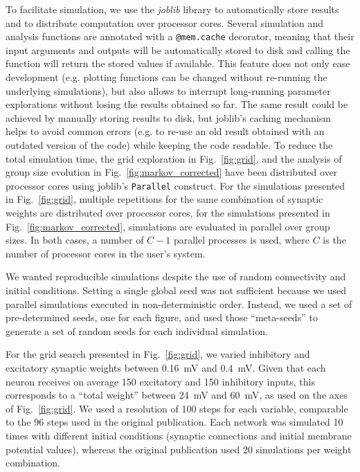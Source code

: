 \documentclass[10pt,a4paper,onecolumn]{article}
\begin{document}
To facilitate simulation, we use the \emph{joblib} library to automatically store results and to distribute computation over processor cores. Several simulation and analysis functions are annotated with a \verb|@mem.cache| decorator, meaning that their input arguments and outputs will be automatically stored to disk and calling the function will return the stored values if available. This feature does not only ease development (e.g. plotting functions can be changed without re-running the underlying simulations), but also allows to interrupt long-running parameter explorations without losing the results obtained so far. The same result could be achieved by manually storing results to disk, but joblib's caching mechanism helps to avoid common errors (e.g. to re-use an old result obtained with an outdated version of the code) while keeping the code readable. To reduce the total simulation time, the grid exploration in Fig.~\ref{fig:grid}, and the analysis of group size evolution in Fig.~\ref{fig:markov_corrected} have been distributed over processor cores using joblib's \verb|Parallel| construct. For the simulations presented in Fig.~\ref{fig:grid}, multiple repetitions for the same combination of synaptic weights are distributed over processor cores, for the simulations presented in Fig.~\ref{fig:markov_corrected}, simulations are evaluated in parallel over group sizes. In both cases, a number of $C-1$ parallel processes is used, where $C$ is the number of processor cores in the user's system.

We wanted reproducible simulations despite the use of random connectivity and initial conditions. Setting a single global seed was not sufficient because we used parallel simulations executed in non-deterministic order. Instead, we used a set of pre-determined seeds, one for each figure, and used those ``meta-seeds'' to generate a set of random seeds for each individual simulation.

For the grid search presented in Fig.~\ref{fig:grid}, we varied inhibitory and excitatory synaptic weights between \SI{0.16}{\milli\volt} and \SI{0.4}{\milli\volt}. Given that each neuron receives on average 150 excitatory and 150 inhibitory inputs, this corresponds to a ``total weight'' between \SI{24}{\milli\volt} and \SI{60}{\milli\volt}, as used on the axes of Fig.~\ref{fig:grid}. We used a resolution of 100 steps for each variable, comparable to the 96 steps used in the original publication. Each network was simulated 10 times with different initial conditions (synaptic connections and initial membrane potential values), whereas the original publication used 20 simulations per weight combination.
\end{document}
